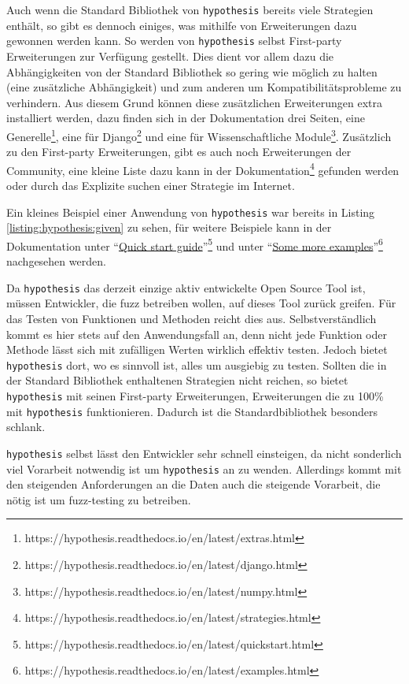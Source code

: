 Auch wenn die Standard Bibliothek von \lstinline{hypothesis} bereits viele 
Strategien enthält, so gibt es dennoch einiges, was mithilfe von Erweiterungen 
dazu gewonnen werden kann. So werden von \lstinline{hypothesis} selbst 
First-party Erweiterungen zur Verfügung gestellt. Dies dient vor allem dazu die 
Abhängigkeiten von der Standard Bibliothek so gering wie möglich zu halten 
(eine zusätzliche Abhängigkeit) und zum anderen um Kompatibilitätsprobleme zu 
verhindern. Aus diesem Grund können diese zusätzlichen Erweiterungen extra 
installiert werden, dazu finden sich in der Dokumentation drei Seiten, eine 
Generelle\footnote{https://hypothesis.readthedocs.io/en/latest/extras.html}, 
eine für 
Django\footnote{https://hypothesis.readthedocs.io/en/latest/django.html} und 
eine für Wissenschaftliche 
Module\footnote{https://hypothesis.readthedocs.io/en/latest/numpy.html}.
Zusätzlich zu den First-party Erweiterungen, gibt es auch noch Erweiterungen 
der Community, eine kleine Liste dazu kann in der  
Dokumentation\footnote{https://hypothesis.readthedocs.io/en/latest/strategies.html}
gefunden werden oder durch das Explizite suchen einer Strategie im Internet.

Ein kleines Beispiel einer Anwendung von \lstinline{hypothesis} war bereits in 
Listing \ref{listing:hypothesis:given} zu sehen, für weitere Beispiele kann in 
der Dokumentation unter
"`\href{https://hypothesis.readthedocs.io/en/latest/quickstart.html}{Quick
start
guide}"'\footnote{https://hypothesis.readthedocs.io/en/latest/quickstart.html}
und unter
"`\href{https://hypothesis.readthedocs.io/en/latest/examples.html}{Some more
examples}"'\footnote{https://hypothesis.readthedocs.io/en/latest/examples.html}
nachgesehen werden.

Da \lstinline{hypothesis} das derzeit einzige aktiv entwickelte Open Source 
Tool ist, müssen Entwickler, die \gls{fuzz} betreiben wollen, auf dieses Tool 
zurück greifen. Für das Testen von Funktionen und Methoden reicht dies aus. 
Selbstverständlich kommt es hier stets auf den Anwendungsfall an, denn nicht 
jede Funktion oder Methode lässt sich mit zufälligen Werten wirklich effektiv 
testen. Jedoch bietet \lstinline{hypothesis} dort, wo es sinnvoll ist, alles
um ausgiebig zu testen. Sollten die in der Standard Bibliothek enthaltenen 
Strategien nicht reichen, so bietet \lstinline{hypothesis} mit seinen 
First-party Erweiterungen, Erweiterungen die zu 100\% mit 
\lstinline{hypothesis} funktionieren. Dadurch ist die Standardbibliothek 
besonders schlank.

\lstinline{hypothesis} selbst lässt den Entwickler sehr schnell einsteigen, da 
nicht sonderlich viel Vorarbeit notwendig ist um \lstinline{hypothesis} an zu 
wenden. Allerdings kommt mit den steigenden Anforderungen an die Daten auch die 
steigende Vorarbeit, die nötig ist um \gls{fuzz}-testing zu betreiben.

